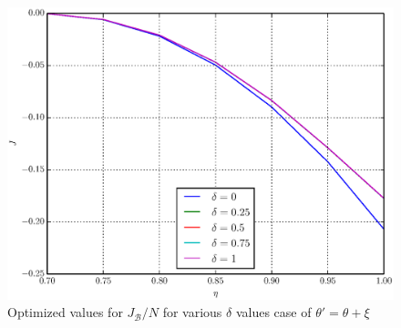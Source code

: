 \documentclass[11pt]{article}
\begin{document}
\begin{figure}[t]
\includegraphics[scale=0.7]{J_ang.eps}
\caption{Optimized values for $J_{\mathcal{B}}/N$ for various $\delta$ values case of $\theta' = \theta + \xi$}
\label{fig:J_ang}
\end{figure}


\begingroup
\small
\end{document}
